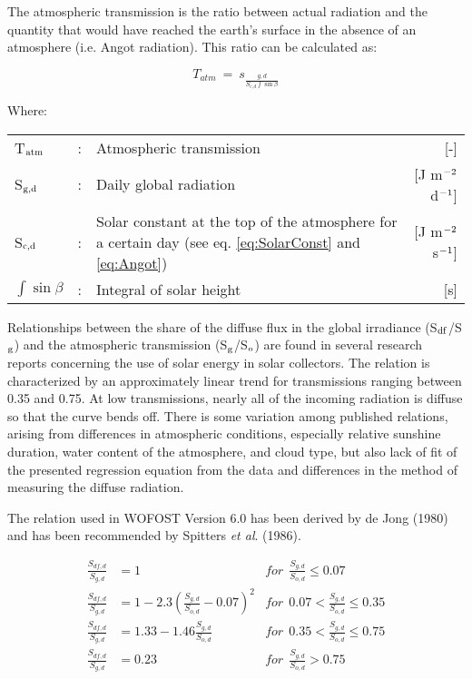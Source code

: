 The atmospheric transmission is the ratio between actual radiation and the quantity that
would have reached the earth's surface in the absence of an atmosphere (i.e. Angot
radiation). This ratio can be calculated as:

\begin{equation}
\label{eq:Tatm}
T _{atm} ~=~ s _{\frac{g,d}{S _{c,d} \int \sin \beta }}
\end{equation}

Where:\\[5pt]
\begin{tabularx}{\textwidth}{llXr}
	T$_{{\rm atm}}$ &:& Atmospheric transmission  & [-]\\
	S$_{{\rm g,d}}$ &:& Daily global radiation  & [J m$^{{\rm -2}}$ d$^{{\rm -1}}$]\\
	S$_{{\rm c,d}}$ &:& Solar constant at the top of the atmosphere for a certain day 
	(see eq. \ref{eq:SolarConst} and \ref{eq:Angot})  & [J m$^{{\rm -2}}$ s$^{{\rm -1}}$]\\
	$\int \sin \beta$  &:& Integral of solar height   & [s]\\
\end{tabularx}

Relationships between the share of the diffuse flux in the global irradiance 
(S$_{{\rm df}}$/S$_{{\rm g}}$) and the atmospheric transmission 
(S$_{{\rm g}}$/S$_{{\rm o}}$) are found in several research reports concerning the use
of solar energy in solar collectors. The relation is characterized by an approximately
linear trend for transmissions ranging between 0.35 and 0.75. At low transmissions,
nearly all of the incoming radiation is diffuse so that the curve bends off.
There is some variation among published relations, arising from differences in atmospheric 
conditions, especially relative sunshine duration, water content of the atmosphere,
and cloud type, but also lack of fit of the presented regression equation from the data and
differences in the method of measuring the diffuse radiation.

The relation used in WOFOST Version 6.0 has been derived by de Jong (1980) and has
been recommended by Spitters {\it et al}. (1986).

\begin{align}
\label{eq:irrad_diffuse}
{\frac{S _{df,d} }{S _{g, d} }} &= 1 & 
for ~~ {\frac{S _{g,d} }{S _{o,d} }} \le 0.07 \nonumber \\
{\frac{S _{df,d} }{S _{g,d} }} &= 1-2.3({\frac{S _{g,d} }{S _{o,d} }} -0.07) ^{2} & 
for ~~ 0.07 < {\frac{S _{g,d} }{S _{o,d} }} \le 0.35  \nonumber \\
{\frac{S _{df,d} }{S _{g,d} }} &= 1.33-1.46{\frac{S _{g,d} }{S _{o,d} }} &
for ~~ 0.35 < {\frac{S _{g,d} }{S _{o,d} }} \le 0.75 \nonumber \\
{\frac{S _{df,d} }{S _{g,d} }} &= 0.23 &
for ~~ {\frac{S _{g,d} }{S _{o,d} }} > 0.75 \nonumber \\
\end{align}

